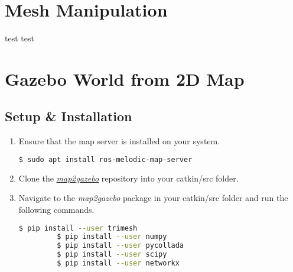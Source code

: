 \documentclass[11pt]{article}
\begin{document}
\section{Mesh Manipulation}
test test


\section{Gazebo World from 2D Map}
\subsection{Setup \& Installation}
\begin{enumerate}
 \item{
       Ensure that the map server is installed on your system.
       \begin{lstlisting}[language=bash]
     $ sudo apt install ros-melodic-map-server
       \end{lstlisting}
       }
 \item{
       Clone the \href{https://github.com/SynapseProgramming/map2gazebo.git
       }{\emph{map2gazebo}} repository into your catkin/src folder.
       
       }
 \item{
       Navigate to the \emph{map2gazebo} package in your catkin/src folder and run the following commands.
       
       \begin{lstlisting}[language=bash]
         $ pip install --user trimesh
         $ pip install --user numpy
         $ pip install --user pycollada
         $ pip install --user scipy
         $ pip install --user networkx
       \end{lstlisting}
       
       
       }
\end{enumerate}
\end{document}
